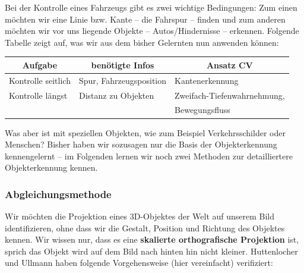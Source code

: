 Bei der Kontrolle eines Fahrzeugs gibt es zwei wichtige Bedingungen: Zum einen möchten wir eine Linie bzw. Kante -- die Fahrspur -- finden und zum anderen möchten wir vor uns liegende Objekte -- Autos/Hindernisse -- erkennen. Folgende Tabelle zeigt auf, was wir aus dem bisher Gelernten nun anwenden können:
\begin{table}[h]
\centering
\label{Tab. 3.2}
\begin{tabular}{@{}lll@{}}
\toprule
\multicolumn{1}{c}{\textbf{Aufgabe}} & \multicolumn{1}{c}{\textbf{benötigte Infos}} & \multicolumn{1}{c}{\textbf{Ansatz CV}} \\ \midrule
Kontrolle seitlich & Spur, Fahrzeugsposition & Kantenerkennung \\
Kontrolle längst & Distanz zu Objekten & Zweifach-Tiefenwahrnehmung, \\&&Bewegungsfluss \\ \bottomrule
\end{tabular}
\end{table}

Was aber ist mit speziellen Objekten, wie zum Beispiel Verkehrsschilder oder Menschen? Bisher haben wir sozusagen nur die Basis der Objekterkennung kennengelernt -- im Folgenden lernen wir noch zwei Methoden zur detailliertere Objekterkennung kennen.

\subsubsection{Abgleichungsmethode}

Wir möchten die Projektion eines 3D-Objektes der Welt auf unserem Bild identifizieren, ohne dass wir die Gestalt, Position und Richtung des Objektes kennen. Wir wissen nur, dass es eine \textbf{skalierte orthografische Projektion} ist, sprich das Objekt wird auf dem Bild nach hinten hin nicht kleiner.
Huttenlocher und \mbox{Ullmann} haben folgende Vorgehensweise (hier vereinfacht) verifiziert:


